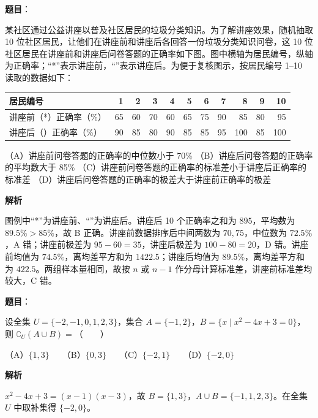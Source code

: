 \begin{answer}

\textbf{题目}：

某社区通过公益讲座以普及社区居民的垃圾分类知识。为了解讲座效果，随机抽取 10 位社区居民，让他们在讲座前和讲座后各回答一份垃圾分类知识问卷，这 10 位社区居民在讲座前和讲座后问卷答题的正确率如下图。图中横轴为居民编号，纵轴为正确率；“*”表示讲座前，“\textbullet{}”表示讲座后。为便于复核图示，按居民编号 1–10 读取的数据如下：

\begin{center}
\begingroup\setlength{\tabcolsep}{4pt}
\begin{tabular}{lrrrrrrrrrr}
\toprule
居民编号 & 1 & 2 & 3 & 4 & 5 & 6 & 7 & 8 & 9 & 10 \\
\midrule
讲座前（*）正确率（\%） & 65 & 60 & 70 & 60 & 65 & 75 & 90 & 85 & 80 & 95 \\
讲座后（\textbullet{}）正确率（\%） & 90 & 85 & 80 & 90 & 85 & 85 & 95 & 100 & 85 & 100 \\
\bottomrule
\end{tabular}
\endgroup
\end{center}

（A）讲座前问卷答题的正确率的中位数小于 70\%  
（B）讲座后问卷答题的正确率的平均数大于 85\%  
（C）讲座前问卷答题的正确率的标准差小于讲座后正确率的标准差  
（D）讲座后问卷答题的正确率的极差大于讲座前正确率的极差
\nopagebreak[4]
\begin{center}\end{center}
\nopagebreak[4]
\textbf{解析}

图例中“*”为讲座前、“\textbullet{}”为讲座后。讲座后 10 个正确率之和为 $895$，平均数为 $89.5\%>85\%$，故 B 正确。讲座前数据排序后中间两数为 $70,75$，中位数为 $72.5\%$，A 错；讲座前极差为 $95-60=35$，讲座后极差为 $100-80=20$，D 错。讲座前均值为 $74.5\%$，离均差平方和为 $1422.5$；讲座后均值为 $89.5\%$，离均差平方和为 $422.5$。两组样本量相同，故按 $n$ 或 $n-1$ 作分母计算标准差，讲座前标准差均较大，C 错。


\end{answer}
\begin{answer}

\textbf{题目}：

设全集 $U=\{-2,-1,0,1,2,3\}$，集合 $A=\{-1,2\}$，$B=\{x\mid x^2-4x+3=0\}$，则 $\complement_U(A\cup B)=$\mbox{（　　）}

（A）$\{1,3\}$　　（B）$\{0,3\}$　　（C）$\{-2,1\}$　　（D）$\{-2,0\}$

\textbf{解析}

$x^2-4x+3=(x-1)(x-3)$，故 $B=\{1,3\}$，$A\cup B=\{-1,1,2,3\}$。在全集 $U$ 中取补集得 $\{-2,0\}$。


\end{answer}
